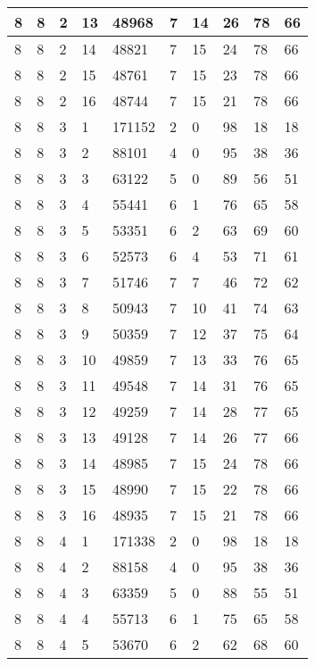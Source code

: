 \begin{table}[!ht]
\begin{tabular}{|l|l|l|l|l|l|l|l|l|l|}
        8 & 8 & 2 & 13 & 48968 & 7 & 14 & 26 & 78 & 66 \\ \hline
        8 & 8 & 2 & 14 & 48821 & 7 & 15 & 24 & 78 & 66 \\ \hline
        8 & 8 & 2 & 15 & 48761 & 7 & 15 & 23 & 78 & 66 \\ \hline
        8 & 8 & 2 & 16 & 48744 & 7 & 15 & 21 & 78 & 66 \\ \hline
        8 & 8 & 3 & 1 & 171152 & 2 & 0 & 98 & 18 & 18 \\ \hline
        8 & 8 & 3 & 2 & 88101 & 4 & 0 & 95 & 38 & 36 \\ \hline
        8 & 8 & 3 & 3 & 63122 & 5 & 0 & 89 & 56 & 51 \\ \hline
        8 & 8 & 3 & 4 & 55441 & 6 & 1 & 76 & 65 & 58 \\ \hline
        8 & 8 & 3 & 5 & 53351 & 6 & 2 & 63 & 69 & 60 \\ \hline
        8 & 8 & 3 & 6 & 52573 & 6 & 4 & 53 & 71 & 61 \\ \hline
        8 & 8 & 3 & 7 & 51746 & 7 & 7 & 46 & 72 & 62 \\ \hline
        8 & 8 & 3 & 8 & 50943 & 7 & 10 & 41 & 74 & 63 \\ \hline
        8 & 8 & 3 & 9 & 50359 & 7 & 12 & 37 & 75 & 64 \\ \hline
        8 & 8 & 3 & 10 & 49859 & 7 & 13 & 33 & 76 & 65 \\ \hline
        8 & 8 & 3 & 11 & 49548 & 7 & 14 & 31 & 76 & 65 \\ \hline
        8 & 8 & 3 & 12 & 49259 & 7 & 14 & 28 & 77 & 65 \\ \hline
        8 & 8 & 3 & 13 & 49128 & 7 & 14 & 26 & 77 & 66 \\ \hline
        8 & 8 & 3 & 14 & 48985 & 7 & 15 & 24 & 78 & 66 \\ \hline
        8 & 8 & 3 & 15 & 48990 & 7 & 15 & 22 & 78 & 66 \\ \hline
        8 & 8 & 3 & 16 & 48935 & 7 & 15 & 21 & 78 & 66 \\ \hline
        8 & 8 & 4 & 1 & 171338 & 2 & 0 & 98 & 18 & 18 \\ \hline
        8 & 8 & 4 & 2 & 88158 & 4 & 0 & 95 & 38 & 36 \\ \hline
        8 & 8 & 4 & 3 & 63359 & 5 & 0 & 88 & 55 & 51 \\ \hline
        8 & 8 & 4 & 4 & 55713 & 6 & 1 & 75 & 65 & 58 \\ \hline
        8 & 8 & 4 & 5 & 53670 & 6 & 2 & 62 & 68 & 60 \\ \hline

\end{tabular}
\end{table}
